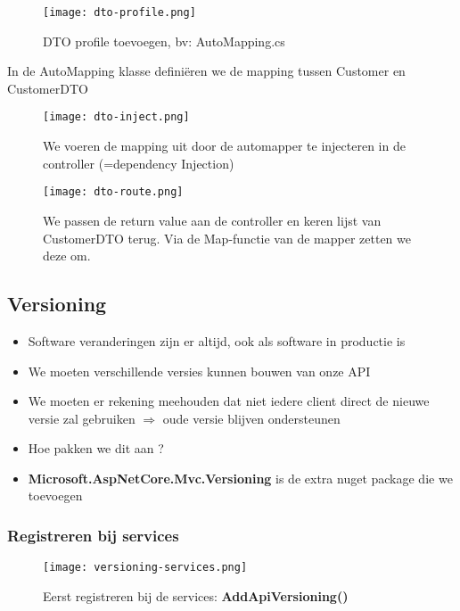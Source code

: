 \documentclass{article}
\begin{document}
\begin{figure}[H]
    \centering
    \texttt{[image: dto-profile.png]}
    \caption{DTO profile toevoegen, bv: AutoMapping.cs}
\end{figure}

In de AutoMapping klasse definiëren we de mapping tussen Customer en CustomerDTO

\begin{figure}[H]
    \centering
    \texttt{[image: dto-inject.png]}
    \caption{We voeren de mapping uit door de automapper te injecteren in de controller (=dependency Injection)}
\end{figure}

\begin{figure}[H]
    \centering
    \texttt{[image: dto-route.png]}
    \caption{We passen de return value aan de controller en keren lijst van CustomerDTO terug. Via de Map-functie van de mapper zetten we deze om.}
\end{figure}


\subsection{Versioning}

\begin{itemize}
    \item Software veranderingen zijn er altijd, ook als software in productie is
    \item We moeten verschillende versies kunnen bouwen van onze API
    \item We moeten er rekening meehouden dat niet iedere client direct de nieuwe versie zal gebruiken $\Rightarrow$ oude versie blijven ondersteunen
    \item Hoe pakken we dit aan ?
    \item \textbf{Microsoft.AspNetCore.Mvc.Versioning} is de extra nuget package die we toevoegen
\end{itemize}

\subsubsection{Registreren bij services}

\begin{figure}[H]
    \centering
    \texttt{[image: versioning-services.png]}
    \caption{Eerst registreren bij de services: \textbf{AddApiVersioning()}}
\end{figure}
\end{document}
